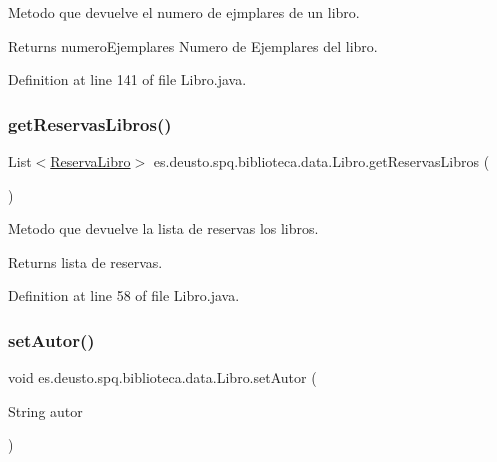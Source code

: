 Metodo que devuelve el numero de ejmplares de un libro. \begin{DoxyReturn}{Returns}
numero\+Ejemplares Numero de Ejemplares del libro. 
\end{DoxyReturn}


Definition at line 141 of file Libro.\+java.

\mbox{\label{classes_1_1deusto_1_1spq_1_1biblioteca_1_1data_1_1_libro_ae9f3b6584e5e7d12a44f16ba076f22f8}} 
\subsubsection{\texorpdfstring{get\+Reservas\+Libros()}{getReservasLibros()}}
{\footnotesize\ttfamily List$<$\mbox{\hyperlink{classes_1_1deusto_1_1spq_1_1biblioteca_1_1data_1_1_reserva_libro}{Reserva\+Libro}}$>$ es.\+deusto.\+spq.\+biblioteca.\+data.\+Libro.\+get\+Reservas\+Libros (\begin{DoxyParamCaption}{ }\end{DoxyParamCaption})}

Metodo que devuelve la lista de reservas los libros. \begin{DoxyReturn}{Returns}
lista de reservas. 
\end{DoxyReturn}


Definition at line 58 of file Libro.\+java.

\mbox{\label{classes_1_1deusto_1_1spq_1_1biblioteca_1_1data_1_1_libro_acad30600304a2c4ccb3d5e76d78f8b38}} 
\subsubsection{\texorpdfstring{set\+Autor()}{setAutor()}}
{\footnotesize\ttfamily void es.\+deusto.\+spq.\+biblioteca.\+data.\+Libro.\+set\+Autor (\begin{DoxyParamCaption}\item[{String}]{autor }\end{DoxyParamCaption})}

